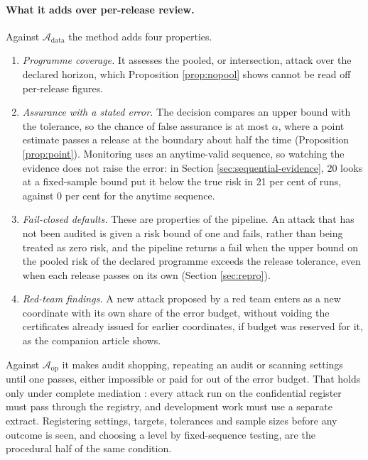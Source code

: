 \documentclass[11pt,a4paper]{article}
\theoremstyle{plain}
\theoremstyle{definition}
\theoremstyle{definition}
\theoremstyle{plain}
\begin{document}
\paragraph{What it adds over per-release review.} Against
$\mathcal{A}_{\mathrm{data}}$ the method adds four properties.
\begin{enumerate}
\item[(a)] \emph{Programme coverage.} It assesses the pooled, or intersection,
attack over the declared horizon, which Proposition \ref{prop:nopool} shows cannot
be read off per-release figures.
\item[(b)] \emph{Assurance with a stated error.} The decision compares an upper
bound with the tolerance, so the chance of false assurance is at most $\alpha$,
where a point estimate passes a release at the boundary about half the time
(Proposition \ref{prop:point}). Monitoring uses an anytime-valid sequence, so
watching the evidence does not raise the error: in Section
\ref{sec:sequential-evidence}, 20 looks at a fixed-sample bound put it below the
true risk in 21 per cent of runs, against 0 per cent for the anytime sequence.
\item[(c)] \emph{Fail-closed defaults.} These are properties of the pipeline. An
attack that has not been audited is given a risk bound of one and fails, rather
than being treated as zero risk, and the pipeline returns a fail when the upper
bound on the pooled risk of the declared programme exceeds the release
tolerance, even when each release passes on its own (Section \ref{sec:repro}).
\item[(d)] \emph{Red-team findings.} A new attack proposed by a red team enters
as a new coordinate with its own share of the error budget, without voiding the
certificates already issued for earlier coordinates, if budget was reserved for
it, as the companion article shows.
\end{enumerate}
Against $\mathcal{A}_{\mathrm{op}}$ it makes audit shopping, repeating an audit or
scanning settings until one passes, either impossible or paid for out of the
error budget. That holds only under complete mediation \citep{saltzer1975}: every
attack run on the confidential register must pass through the registry, and
development work must use a separate extract. Registering settings, targets,
tolerances and sample sizes before any outcome is seen, and choosing a level by
fixed-sequence testing, are the procedural half of the same condition.
\end{document}
